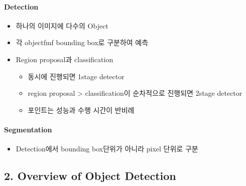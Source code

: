 \documentclass[
]{article}
\providecommand{\tightlist}{%
  \setlength{\itemsep}{0pt}\setlength{\parskip}{0pt}}
\begin{document}
\hypertarget{detection}{%
\paragraph{Detection}\label{detection}}

\begin{itemize}
\tightlist
\item
  하나의 이미지에 다수의 Object
\item
  각 objectfmf bounding box로 구분하여 예측
\item
  Region proposal과 classification

  \begin{itemize}
  \tightlist
  \item
    동시에 진행되면 1stage detector
  \item
    region proposal \textgreater{} classification이 순차적으로 진행되면
    2stage detector
  \item
    포인트는 성능과 수행 시간이 반비례
  \end{itemize}
\end{itemize}

\hypertarget{segmentation}{%
\paragraph{Segmentation}\label{segmentation}}

\begin{itemize}
\tightlist
\item
  Detection에서 bounding box단위가 아니라 pixel 단위로 구분
\end{itemize}

\hypertarget{overview-of-object-detection}{%
\subsection{2. Overview of Object
Detection}\label{overview-of-object-detection}}
\end{document}
